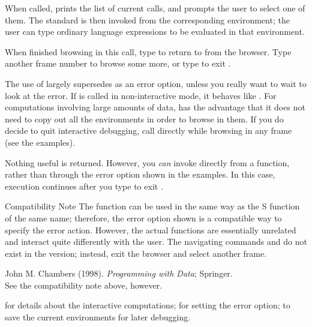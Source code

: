 %
\begin{Details}\relax
When called,  prints the list of current calls, and
prompts the user to select one of them.  The standard \R{}
 is then invoked from the corresponding
environment; the user can type ordinary \R{} language expressions to be
evaluated in that environment.

When finished browsing in this call, type  to return to
 from the browser.  Type another frame number to browse
some more, or type  to exit .

The use of  largely supersedes 
as an error option, unless you really want to wait to look at the
error.  If  is called in non-interactive mode, it
behaves like .  For computations involving large
amounts of data,  has the advantage that it does not
need to copy out all the environments in order to browse in them.  If
you do decide to quit interactive debugging, call
 directly while browsing in any frame (see
the examples).
\end{Details}
%
\begin{Value}
Nothing useful is returned.  However, you \emph{can} invoke
 directly from a function, rather than through the error
option shown in the examples.  In this case, execution continues
after you type  to exit .
\end{Value}
%
\begin{Section}{Compatibility Note}
The \R{}  function can be used in the same way as the
S function of the same name; therefore, the error option shown is
a compatible way to specify the error action.  However, the actual
functions are essentially unrelated and interact quite differently
with the user.  The navigating commands  and  do
not exist in the \R{} version; instead, exit the browser and select
another frame.
\end{Section}
%
\begin{References}\relax
John M. Chambers (1998).
\emph{Programming with Data}; Springer. \\{}
See the compatibility note above, however.
\end{References}
%
\begin{SeeAlso}\relax
{} for details about the interactive computations;
 for setting the error option;
 to save the current environments for later
debugging.
\end{SeeAlso}

